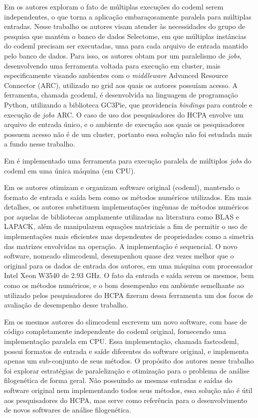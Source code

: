 \documentclass[cic,tc]{iiufrgs}
\begin{document}
Em \cite{moretti2012gcodeml} os autores exploram o fato de múltiplas execuções
do codeml serem independentes, o que torna a aplicação embaraçosamente
paralela para múltiplas entradas. Nesse trabalho os autores visam atender às
necessidades do grupo de pesquisa que mantém o banco de dados Selectome, em
que múltiplas instâncias do codeml precisam ser executadas, uma para cada
arquivo de entrada mantido pelo banco de dados. Para isso, os autores obtam
por um paralelismo de \textit{jobs}, desenvolvendo uma ferramenta voltada
para execução em cluster, mais especificamente visando ambientes com o
\textit{middleware} Advanced Resource Connector (ARC), utilizado no grid aos
quais os autores possuíam acesso. A ferramenta, chamada gcodeml, é desenvolvida
na linguagem de programação Python, utilizando a biblioteca GC3Pie, que
providencia \textit{bindings} para controle e execução de \textit{jobs} ARC. O
caso de uso dos pesquisadores do HCPA envolve um arquivo de entrada único, e
o ambiente de execução aos quais os pesquisadores possuem acesso não é de um
cluster, portanto essa solução não foi estudada mais a fundo nesse trabalho.

Em \cite{maldonado2016lmap} é implementado uma
ferramenta para execução paralela de múltiplos \textit{jobs} do codeml
em uma única máquina (em CPU). %

Em \cite{schabauer2012slimcodeml} os autores otimizam e organizam software
original (codeml), mantendo o formato de entrada e saída bem como os métodos
numéricos utilizados. Em mais detalhes, os autores substituem implementações
ingênuas de métodos numéricos por aquelas de bibliotecas amplamente utilizadas
na literatura como BLAS e LAPACK, além de manipularem equações matriciais a fim
de permitir o uso de implementações mais eficientes mas dependentes de
propriedades como a simetria das matrizes envolvidas na operação. A
implementação é sequencial. O novo software, nomeado slimcodeml, desempenhou
quase dez vezes melhor que o original para os dados de entrada dos autores, em
uma máquina com processador Intel Xeon W3540 de 2.93 GHz. O fato da entrada e
saída serem os mesmos, bem como os métodos numéricos, e o bom desempenho em
ambiente semelhante ao utilizado pelos pesquisadores do HCPA fizeram dessa
ferramenta um dos focos de avaliação de desempenho desse trabalho.

Em \cite{valle2014optimization} os mesmos autores do slimcodeml escrevem um
novo software, com base de código completamente independente do codeml
original, fornecendo uma implementação paralela em CPU. Essa implementação,
chamada fastcodeml, possui formatos de entrada e saíde diferentes do software
original, e implementa apenas um sub-conjunto de seus métodos. O propósito dos
autores nesse trabalho foi explorar estratégias de paralelização e otimização
para o problema de análise filogenética de forma geral. Não possuindo as mesmas
entradas e saídas do software original nem implementando todos seus métodos,
essa solução não é útil aos pesquisadores do HCPA, mas serve como referência
para o desenvolvimento de novos softwares de análise filogenética.
\end{document}
